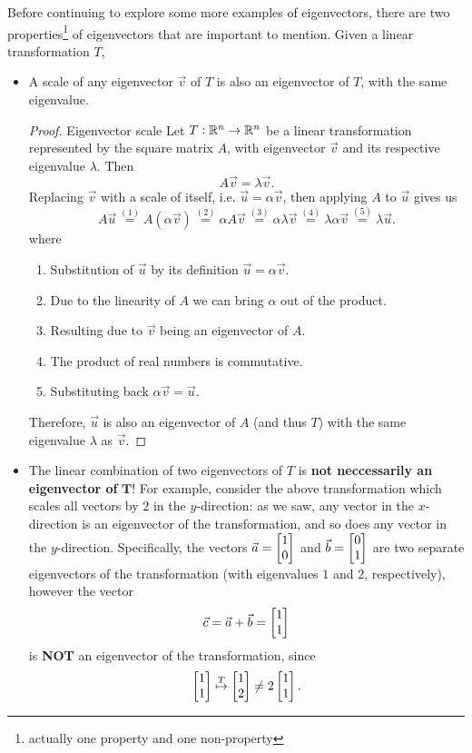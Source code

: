 Before continuing to explore some more examples of eigenvectors, there are two properties\footnote{actually one property and one non-property} of eigenvectors that are important to mention. Given a linear transformation $T$,
\begin{itemize}
	\item A scale of any eigenvector $\vec{v}$ of $T$ is also an eigenvector of $T$, with the same eigenvalue.
		\begin{proof}{Eigenvector scale}{}
			Let $T:\mathbb{R}^{n}\to\mathbb{R}^{n}$ be a linear transformation represented by the square matrix $A$, with eigenvector $\vec{v}$ and its respective eigenvalue $\lambda$. Then
			\[
				A\vec{v} = \lambda\vec{v}.
			\]
			Replacing $\vec{v}$ with a scale of itself, i.e. $\vec{u}=\alpha\vec{v}$, then applying $A$ to $\vec{u}$ gives us
			\[
				A\vec{u} \overset{(1)}{=} A \left( \alpha\vec{v} \right) \overset{(2)}{=} \alpha A \vec{v} \overset{(3)}{=} \alpha\lambda\vec{v} \overset{(4)}{=} \lambda\alpha\vec{v} \overset{(5)}{=} \lambda\vec{u}.
			\]
			where
			\begin{enumerate}[label=(\arabic*)]
				\item Substitution of $\vec{u}$ by its definition $\vec{u}=\alpha\vec{v}$.
				\item Due to the linearity of $A$ we can bring $\alpha$ out of the product.
				\item Resulting due to $\vec{v}$ being an eigenvector of $A$.
				\item The product of real numbers is commutative.
				\item Substituting back $\alpha\vec{v}=\vec{u}$.
			\end{enumerate}

			Therefore, $\vec{u}$ is also an eigenvector of $A$ (and thus $T$) with the same eigenvalue $\lambda$ as $\vec{v}$.
		\end{proof}

	\item The linear combination of two eigenvectors of $T$ is \textbf{not neccessarily an eigenvector of} $\bm{T}$! For example, consider the above transformation which scales all vectors by $2$ in the $y$-direction: as we saw, any vector in the $x$-direction is an eigenvector of the transformation, and so does any vector in the $y$-direction. Specifically, the vectors $\vec{a}=\colvec{1;0}$ and $\vec{b}=\colvec{0;1}$ are two separate eigenvectors of the transformation (with eigenvalues $1$ and $2$, respectively), however the vector
		\[
			\vec{c} = \vec{a}+\vec{b} = \colvec{1;1}
		\]
		is \textbf{NOT} an eigenvector of the transformation, since
		\[
			\colvec{1;1} \overset{T}{\mapsto} \colvec{1;2} \neq 2\colvec{1;1}.
		\]
\end{itemize}

